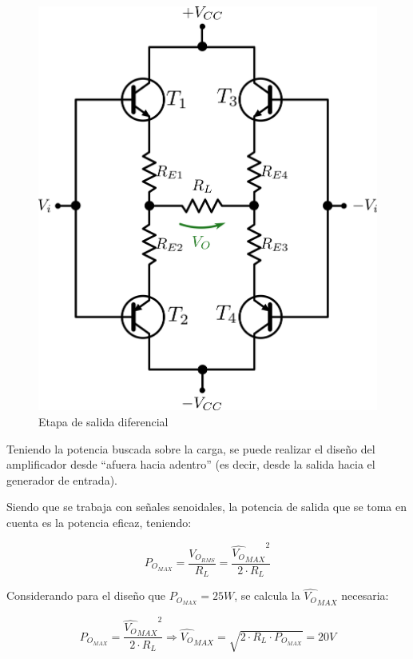 \begin{figure}[!ht]
\begin{centering}
\includegraphics[scale=0.5]{Imagenes/EtapaSalida.png}
\par\end{centering}
\caption{Etapa de salida diferencial}
\end{figure}

Teniendo la potencia buscada sobre la carga, se puede realizar el diseño del amplificador desde ``afuera hacia adentro'' (es decir, desde la salida hacia el generador de entrada).\par
Siendo que se trabaja con señales senoidales, la potencia de salida que se toma en cuenta es la potencia eficaz, teniendo:

\[
P_{O_{MAX}} = \frac{V_{O_{RMS}}}{R_L} = \frac{{\hat{V_O}_{MAX}}^2}{2 \cdot R_L}
\]

Considerando para el diseño que $P_{O_{MAX}} = 25W$, se calcula la $\hat{V_O}_{MAX}$ necesaria:

\[
P_{O_{MAX}} = \frac{{\hat{V_O}_{MAX}}^2}{2 \cdot R_L} \Longrightarrow \hat{V_O}_{MAX} = \sqrt{2 \cdot R_L \cdot P_{O_{MAX}}} = 20V
\] 

